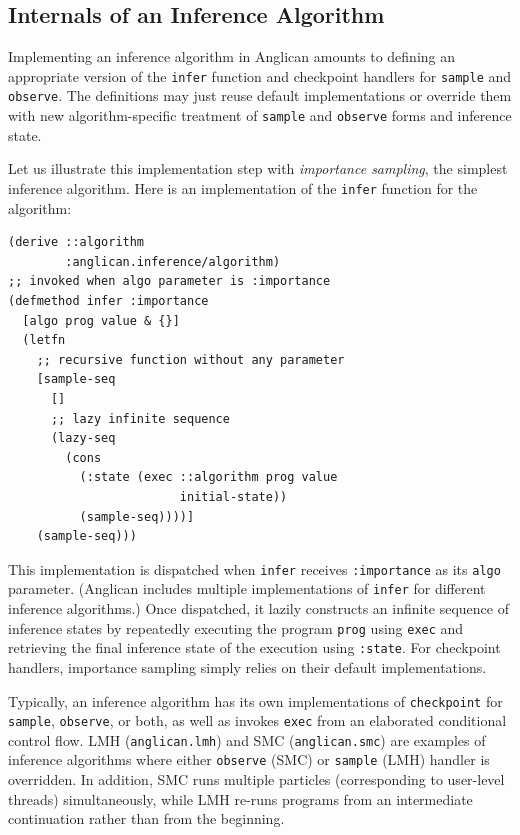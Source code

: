 \documentclass[preprint]{sigplanconf}
\begin{document}
\subsection{Internals of an Inference Algorithm}
\label{seq:internals}

Implementing an inference algorithm in Anglican amounts
to defining an appropriate version of the \texttt{infer} function and 
checkpoint handlers for \texttt{sample} and \texttt{observe}.
The definitions may just reuse default implementations or override them
with new algorithm-specific treatment of \texttt{sample} and \texttt{observe} forms
and inference state.

Let us illustrate this implementation step with
\textit{importance sampling},
the simplest inference algorithm.
Here is an implementation of the \texttt{infer} function for the algorithm:
\begin{lstlisting}[style=default]
(derive ::algorithm
        :anglican.inference/algorithm)
;; invoked when algo parameter is :importance
(defmethod infer :importance 
  [algo prog value & {}]
  (letfn
    ;; recursive function without any parameter
    [sample-seq 
      []
      ;; lazy infinite sequence 
      (lazy-seq
        (cons
          (:state (exec ::algorithm prog value
                        initial-state))
          (sample-seq))))]
    (sample-seq)))
\end{lstlisting}
This implementation is dispatched 
when \texttt{infer} receives \texttt{:importance} as its \texttt{algo} 
parameter. (Anglican includes multiple implementations of \texttt{infer}
for different inference algorithms.) Once dispatched, it lazily 
constructs an infinite sequence of inference states by repeatedly 
executing the program \texttt{prog} using \texttt{exec}
and retrieving the final inference state of the execution 
using \texttt{:state}. For checkpoint handlers, importance sampling simply
relies on their default implementations.

Typically, an inference
algorithm has its own implementations of
\texttt{checkpoint} for \texttt{sample}, \texttt{observe}, or
both, as well as invokes \texttt{exec} from an elaborated
conditional control flow. LMH (\texttt{anglican.lmh}) and SMC
(\texttt{anglican.smc}) are examples of inference algorithms
where either \texttt{observe} (SMC) or \texttt{sample} (LMH)
handler is overridden. In addition, SMC runs multiple particles
(corresponding to user-level threads) simultaneously, while LMH re-runs
programs from an intermediate continuation rather than from the
beginning.
\end{document}
